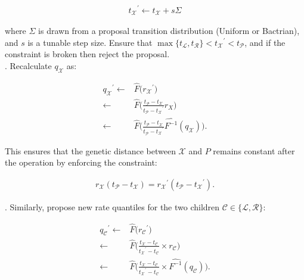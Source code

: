 \documentclass[12pt]{article}
\begin{document}
\begin{align}
	{t_\mathcal{X}}^\prime \leftarrow t_\mathcal{X} + s\Sigma
\end{align}

where $\Sigma$ is drawn from a proposal transition distribution (Uniform or Bactrian), and $s$ is a tunable step size. Ensure that $\max\{t_\mathcal{L}, t_\mathcal{R} \} < {t_\mathcal{X}}^\prime < t_\mathcal{P}$, and if the constraint is broken then reject the proposal.  \\


. Recalculate $q_\mathcal{X}$ as:



\begin{align}
	{q_\mathcal{X}}^\prime  \leftarrow & \hat{F}\Big({r_\mathcal{X}}^\prime \Big) \nonumber\\
				\leftarrow & \hat{F}\Big(\frac{t_\mathcal{P} - t_\mathcal{X}}{t_\mathcal{P} - {t_\mathcal{X}}^\prime} r_X \Big)\nonumber \\
				\leftarrow & \hat{F}\Big(\frac{t_\mathcal{P} - t_\mathcal{X}}{t_\mathcal{P} - {t_\mathcal{X}}^\prime} \hat{F^{-1}}(q_\mathcal{X}) \Big).
\end{align}


This ensures that the genetic distance between $\mathcal{X}$ and $P$ remains constant after the operation by enforcing the constraint:


\begin{align}
	r_\mathcal{X} (t_\mathcal{P} - t_\mathcal{X}) = {r_\mathcal{X}}^\prime (t_\mathcal{P} - {t_\mathcal{X}}^\prime).
\end{align}




. Similarly, propose new rate quantiles for the two children $\mathcal{C} \in \{\mathcal{L}, \mathcal{R}\}$:



\begin{align}
	{q_\mathcal{C}}^\prime  \leftarrow & \hat{F}\Big({r_\mathcal{C}}^\prime \Big) \nonumber\\
				\leftarrow & \hat{F}\Big(\frac{t_\mathcal{X} - t_\mathcal{C}}{{t_\mathcal{X}}^\prime - t_\mathcal{C}} \times r_\mathcal{C} \Big) \nonumber\\
				\leftarrow & \hat{F}\Big(\frac{t_\mathcal{X} - t_\mathcal{C}}{{t_\mathcal{X}}^\prime - t_\mathcal{C}} \times \hat{F^{-1}}(q_\mathcal{C}) \Big).
\end{align}
\end{document}
